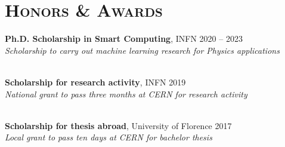 \newcommand{\scholarship}[4]
  {\normalsize 
    \textbf{\color{maincolor} #1}, {\color{hlcolor-1} #2} 
    \hfill {\color{hlcolor-2} #3}\\
    {\color{iconcolor} \faMedal} \emph{\color{maincolor} #4}
  }


\section*{\textsc{Honors \& Awards}}
\begin{cvcontent}
  \scholarship{Ph.D. Scholarship in Smart Computing}{INFN}{2020 -- 2023}{Scholarship to carry out machine learning research for Physics applications}
  \\ [2mm]
  \scholarship{Scholarship for research activity}{INFN}{2019}{National grant to pass three months at CERN for research activity}
  \\ [2mm]
  \scholarship{Scholarship for thesis abroad}{University of Florence}{2017}{Local grant to pass ten days at CERN for bachelor thesis}
\end{cvcontent}